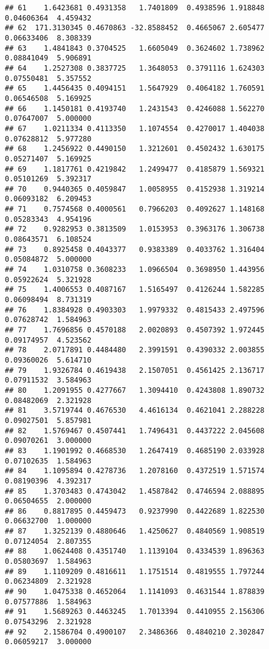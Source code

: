 \documentclass[]{article}
\begin{document}
\begin{verbatim}
## 61    1.6423681 0.4931358   1.7401809  0.4938596 1.918848 0.04606364  4.459432
## 62  171.3130345 0.4670863 -32.8588452  0.4665067 2.605477 0.06633406  8.308339
## 63    1.4841843 0.3704525   1.6605049  0.3624602 1.738962 0.08841049  5.906891
## 64    1.2527308 0.3837725   1.3648053  0.3791116 1.624303 0.07550481  5.357552
## 65    1.4456435 0.4094151   1.5647929  0.4064182 1.760591 0.06546508  5.169925
## 66    1.1450181 0.4193740   1.2431543  0.4246088 1.562270 0.07647007  5.000000
## 67    1.0211334 0.4113350   1.1074554  0.4270017 1.404038 0.07628812  5.977280
## 68    1.2456922 0.4490150   1.3212601  0.4502432 1.630175 0.05271407  5.169925
## 69    1.1817761 0.4219842   1.2499477  0.4185879 1.569321 0.05101269  5.392317
## 70    0.9440365 0.4059847   1.0058955  0.4152938 1.319214 0.06093182  6.209453
## 71    0.7574568 0.4000561   0.7966203  0.4092627 1.148168 0.05283343  4.954196
## 72    0.9282953 0.3813509   1.0153953  0.3963176 1.306738 0.08643571  6.108524
## 73    0.8925458 0.4043377   0.9383389  0.4033762 1.316404 0.05084872  5.000000
## 74    1.0310758 0.3608233   1.0966504  0.3698950 1.443956 0.05922624  5.321928
## 75    1.4006553 0.4087167   1.5165497  0.4126244 1.582285 0.06098494  8.731319
## 76    1.8384928 0.4903303   1.9979332  0.4815433 2.497596 0.07628742  1.584963
## 77    1.7696856 0.4570188   2.0020893  0.4507392 1.972445 0.09174957  4.523562
## 78    2.0717891 0.4484480   2.3991591  0.4390332 2.003855 0.09360026  5.614710
## 79    1.9326784 0.4619438   2.1507051  0.4561425 2.136717 0.07911532  3.584963
## 80    1.2091955 0.4277667   1.3094410  0.4243808 1.890732 0.08482069  2.321928
## 81    3.5719744 0.4676530   4.4616134  0.4621041 2.288228 0.09027501  5.857981
## 82    1.5769467 0.4507441   1.7496431  0.4437222 2.045608 0.09070261  3.000000
## 83    1.1901992 0.4668530   1.2647419  0.4685190 2.033928 0.07102635  1.584963
## 84    1.1095894 0.4278736   1.2078160  0.4372519 1.571574 0.08190396  4.392317
## 85    1.3703483 0.4743042   1.4587842  0.4746594 2.088895 0.06504655  2.000000
## 86    0.8817895 0.4459473   0.9237990  0.4422689 1.822530 0.06632700  1.000000
## 87    1.3252139 0.4880646   1.4250627  0.4840569 1.908519 0.07124054  2.807355
## 88    1.0624408 0.4351740   1.1139104  0.4334539 1.896363 0.05803697  1.584963
## 89    1.1109209 0.4816611   1.1751514  0.4819555 1.797244 0.06234809  2.321928
## 90    1.0475338 0.4652064   1.1141093  0.4631544 1.878839 0.07577886  1.584963
## 91    1.5689263 0.4463245   1.7013394  0.4410955 2.156306 0.07543296  2.321928
## 92    2.1586704 0.4900107   2.3486366  0.4840210 2.302847 0.06059217  3.000000

\end{verbatim}
\end{document}
